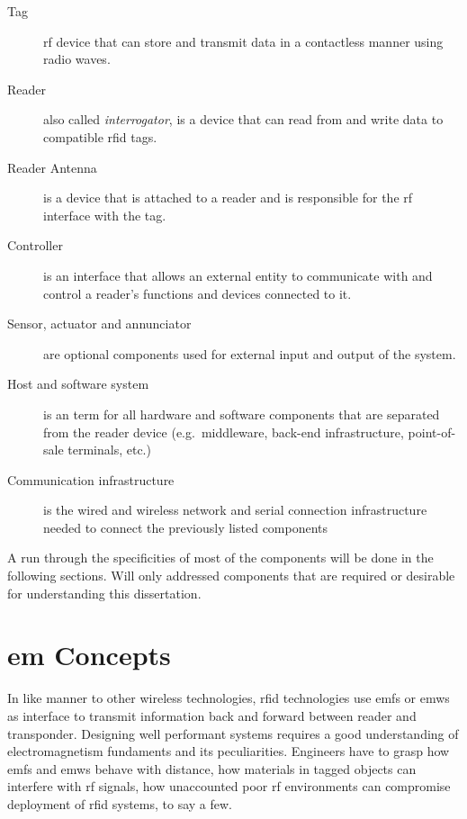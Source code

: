 \begin{description}
    \item[Tag] \ac{rf} device that can store and transmit data in a contactless manner using radio waves.
    \item[Reader] also called \emph{interrogator}, is a device that can read from and write data to compatible \ac{rfid} tags.
    \item[Reader Antenna] is a device that is attached to a reader and is responsible for the \ac{rf} interface with the tag.
    \item[Controller] is an interface that allows an external entity to communicate with and control a reader's functions and devices connected to it.
    \item[Sensor, actuator and annunciator] are optional components used for external input and output of the system.
    \item[Host and software system] is an term for all hardware and software components that are separated from the reader device (e.g.\ middleware, back-end infrastructure, point-of-sale terminals, etc.)
    \item[Communication infrastructure] is the wired and wireless network and serial connection infrastructure needed to connect the previously listed components
\end{description}

A run through the specificities of most of the components will be done in the following sections. Will only addressed components that are required or desirable for understanding this dissertation.


\section{\acl{em} Concepts} \label{sec:em}


In like manner to other wireless technologies, \ac{rfid} technologies use \acp{emf} or \acp{emw} as interface to transmit information back and forward between reader and transponder.
Designing well performant systems requires a good understanding of electromagnetism fundaments and its peculiarities.
Engineers have to grasp how \acp{emf} and \acp{emw} behave with distance, how materials in tagged objects can interfere with \ac{rf} signals, how unaccounted poor \ac{rf} environments can compromise deployment of \ac{rfid} systems, to say a few.

